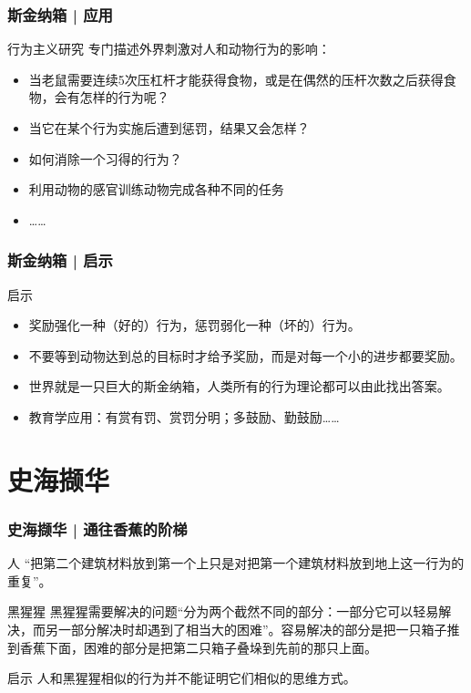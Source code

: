 \begin{frame}
  \frametitle{斯金纳箱 | 应用}
  \begin{block}{行为主义研究}
    专门描述外界刺激对人和动物行为的影响：
    \begin{itemize}
      \item 当老鼠需要连续5次压杠杆才能获得食物，或是在偶然的压杆次数之后获得食物，会有怎样的行为呢？
      \item 当它在某个行为实施后遭到惩罚，结果又会怎样？
      \item 如何消除一个习得的行为？
      \item 利用动物的感官训练动物完成各种不同的任务
      \item ……
    \end{itemize}
  \end{block}
\end{frame}

\begin{frame}
  \frametitle{斯金纳箱 | 启示}
  \begin{block}{启示}
    \begin{itemize}
      \item \alert{奖励强化一种（好的）行为，惩罚弱化一种（坏的）行为。}
      \item \alert{不要等到动物达到总的目标时才给予奖励，而是对每一个小的进步都要奖励。}
      \item 世界就是一只巨大的斯金纳箱，人类所有的行为理论都可以由此找出答案。
      \item 教育学应用：有赏有罚、赏罚分明；多鼓励、勤鼓励……
    \end{itemize}
  \end{block}
\end{frame}

\section{史海撷华}
\begin{frame}
  \frametitle{史海撷华 | 通往香蕉的阶梯}
  \begin{block}{人}
    “把第二个建筑材料放到第一个上只是对把第一个建筑材料放到地上这一行为的重复”。
  \end{block}
  \pause
  \begin{block}{黑猩猩}
    黑猩猩需要解决的问题“分为两个截然不同的部分：一部分它可以轻易解决，而另一部分解决时却遇到了相当大的困难”。容易解决的部分是把一只箱子推到香蕉下面，困难的部分是把第二只箱子叠垛到先前的那只上面。
  \end{block}
  \pause
  \begin{block}{启示}
    人和黑猩猩相似的行为并不能证明它们相似的思维方式。
  \end{block}
\end{frame}

